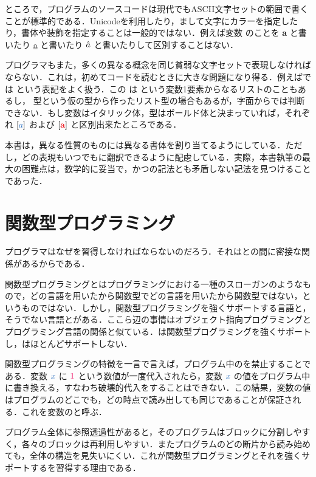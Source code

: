 \documentclass[a5paper,twoside,fleqn,draft]{jsbook}
\begin{document}
\separator

ところで，プログラムのソースコードは現代でもASCII文字セットの範囲で書くことが標準的である．Unicodeを利用したり，まして文字にカラーを指定したり，書体や装飾を指定することは一般的ではない．例えば変数  のことを \textbf{a} と書いたり \underline{a} と書いたり $\Hat a$ と書いたりして区別することはない．

\haskell プログラマもまた，多くの異なる概念を同じ貧弱な文字セットで表現しなければならない．これは，初めて\haskell コードを読むときに大きな問題になり得る．例えば\haskell では \code{[a]} という表記をよく扱う．この \code{[a]} は  という変数1要素からなるリストのこともあるし，  型という仮の型から作ったリスト型の場合もあるが，字面からでは判断できない．もし変数はイタリック体，型はボールド体と決まっていれば，それぞれ $\hListWith{\hVar{a}}$ および $\hListConstruct{\hTypeName{a}}$ と区別出来たところである．

本書は，異なる性質のものには異なる書体を割り当てるようにしている．ただし，どの表現もいつでも\haskell に翻訳できるように配慮している．実際，本書執筆の最大の困難点は，数学的に妥当で，かつ\haskell の記法とも矛盾しない記法を見つけることであった．

\section{関数型プログラミング}

プログラマはなぜ\haskell を習得しなければならないのだろう．それは\haskell との間に密接な関係があるからである．

関数型プログラミングとはプログラミングにおける一種のスローガンのようなもので，どの言語を用いたから関数型でどの言語を用いたから関数型ではない，というものではない．しかし，関数型プログラミングを強くサポートする言語と，そうでない言語とがある．ここら辺の事情はオブジェクト指向プログラミングとプログラミング言語の関係と似ている．\haskell は関数型プログラミングを強くサポートし，\python はほとんどサポートしない．

関数型プログラミングの特徴を一言で言えば，プログラム中のを禁止することである．変数 $\hVar{x}$ に $\hConstant{1}$ という数値が一度代入されたら，変数 $\hVar{x}$ の値をプログラム中に書き換える，すなわち破壊的代入をすることはできない．この結果，変数の値はプログラムのどこでも，どの時点で読み出しても同じであることが保証される．これを変数のと呼ぶ．

プログラム全体に参照透過性があると，そのプログラムはブロックに分割しやすく，各々のブロックは再利用しやすい．またプログラムのどの断片から読み始めても，全体の構造を見失いにくい．これが関数型プログラミングとそれを強くサポートする\haskell を習得する理由である．
\end{document}
